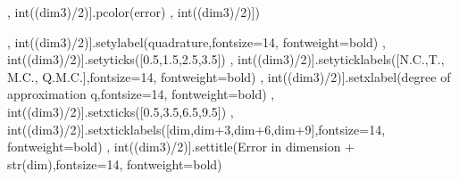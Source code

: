\documentclass[letterpaper,10pt,english]{sphinxmanual}
\begin{document}
{\begin{sphinxVerbatim}[commandchars=\\\{\}]
     

      \PYG{p}{[}, int((dim\PYGZhy{}3)/2)].pcolor(error)
     \PYG{p}{[}, int((dim\PYGZhy{}3)/2)])

    \PYG{p}{[}, int((dim\PYGZhy{}3)/2)].set\PYGZus{}ylabel(\PYGZdq{}quadrature\PYGZdq{},fontsize=14, fontweight=\PYGZdq{}bold\PYGZdq{})
    \PYG{p}{[}, int((dim\PYGZhy{}3)/2)].set\PYGZus{}yticks([0.5,1.5,2.5,3.5])
    \PYG{p}{[}, int((dim\PYGZhy{}3)/2)].set\PYGZus{}yticklabels([\PYGZdq{}N.C.\PYGZdq{},\PYGZdq{}T.\PYGZdq{}, \PYGZdq{}M.C.\PYGZdq{}, \PYGZdq{}Q.M.C.\PYGZdq{}],fontsize=14, fontweight=\PYGZdq{}bold\PYGZdq{})
    \PYG{p}{[}, int((dim\PYGZhy{}3)/2)].set\PYGZus{}xlabel(\PYGZdq{}degree of approximation q\PYGZdq{},fontsize=14, fontweight=\PYGZdq{}bold\PYGZdq{})
    \PYG{p}{[}, int((dim\PYGZhy{}3)/2)].set\PYGZus{}xticks([0.5,3.5,6.5,9.5])
    \PYG{p}{[}, int((dim\PYGZhy{}3)/2)].set\PYGZus{}xticklabels([dim,dim+3,dim+6,dim+9],fontsize=14, fontweight=\PYGZdq{}bold\PYGZdq{})
    \PYG{p}{[}, int((dim\PYGZhy{}3)/2)].set\PYGZus{}title(\PYGZdq{}Error in dimension \PYGZdq{}+ str(dim),fontsize=14, fontweight=\PYGZdq{}bold\PYGZdq{})

 

\end{sphinxVerbatim}
}
\end{document}
